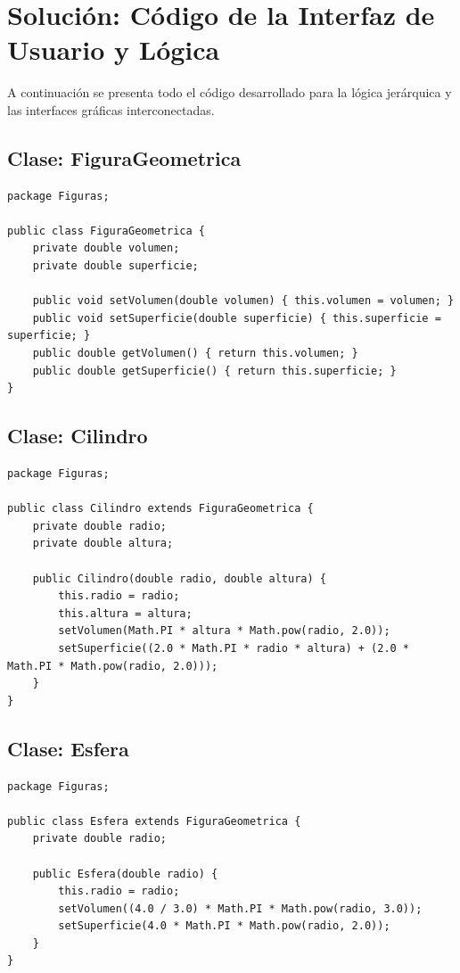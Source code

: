 \documentclass[12pt,a4paper]{article}
\begin{document}
\newpage
\section{Solución: Código de la Interfaz de Usuario y Lógica}
A continuación se presenta todo el código desarrollado para la lógica jerárquica y las interfaces gráficas interconectadas.

\subsection*{Clase: FiguraGeometrica}
\begin{lstlisting}[caption={Clase FiguraGeometrica.java}]
package Figuras;

public class FiguraGeometrica {
    private double volumen;
    private double superficie;

    public void setVolumen(double volumen) { this.volumen = volumen; }
    public void setSuperficie(double superficie) { this.superficie = superficie; }
    public double getVolumen() { return this.volumen; }
    public double getSuperficie() { return this.superficie; }
}
\end{lstlisting}

\subsection*{Clase: Cilindro}
\begin{lstlisting}[caption={Clase Cilindro.java}]
package Figuras;

public class Cilindro extends FiguraGeometrica {
    private double radio;
    private double altura;

    public Cilindro(double radio, double altura) {
        this.radio = radio;
        this.altura = altura;
        setVolumen(Math.PI * altura * Math.pow(radio, 2.0));
        setSuperficie((2.0 * Math.PI * radio * altura) + (2.0 * Math.PI * Math.pow(radio, 2.0)));
    }
}
\end{lstlisting}

\subsection*{Clase: Esfera}
\begin{lstlisting}[caption={Clase Esfera.java}]
package Figuras;

public class Esfera extends FiguraGeometrica {
    private double radio;

    public Esfera(double radio) {
        this.radio = radio;
        setVolumen((4.0 / 3.0) * Math.PI * Math.pow(radio, 3.0));
        setSuperficie(4.0 * Math.PI * Math.pow(radio, 2.0));
    }
}
\end{lstlisting}
\end{document}
